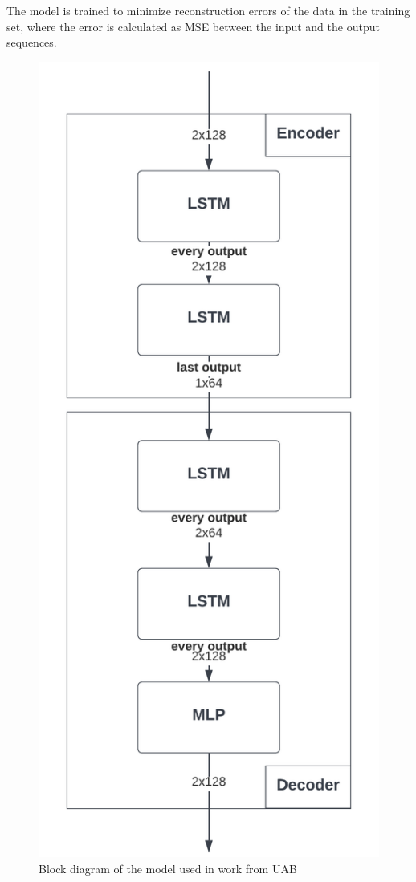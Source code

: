 The model is trained to minimize reconstruction errors of the data in the training set, where the error is calculated as \gls{MSE} between the input and the output sequences.

\begin{figure}[ht]
    \centering
    \includegraphics{images/State-of-art/lstm-autoencoder.png}
    \caption{Block diagram of the model used in work from \gls{UAB}}
    \label{fig:lstm-autoencoder-architecture}
\end{figure}

